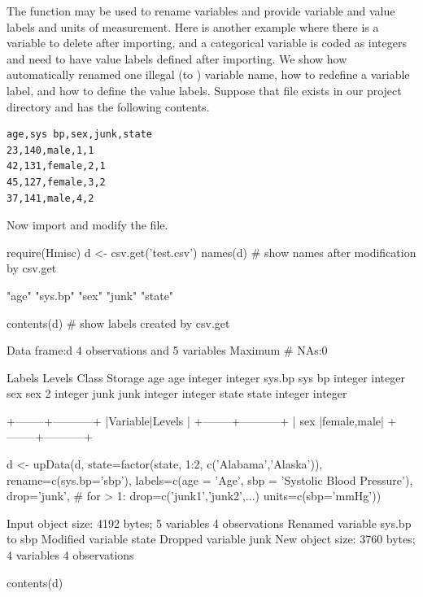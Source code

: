 The   function may be used to rename variables
and provide variable and value labels and units of measurement.
Here is another example where there is a  variable to
delete after importing, and a categorical variable is coded as
integers and need to have value labels defined after
importing.  We show how  automatically renamed one illegal
(to \R) variable name, how to redefine a variable label, and how to
define the value labels.  Suppose that file  exists in
our project directory and has the following contents.
{\small\begin{verbatim}
age,sys bp,sex,junk,state
23,140,male,1,1
42,131,female,2,1
45,127,female,3,2
37,141,male,4,2
\end{verbatim}}
Now import and modify the file.
\begin{Schunk}
\begin{Sinput}
require(Hmisc)
d <- csv.get('test.csv')
names(d)   # show names after modification by csv.get
\end{Sinput}
\begin{Soutput}
[1] "age"    "sys.bp" "sex"    "junk"   "state" 
\end{Soutput}
\begin{Sinput}
contents(d)  # show labels created by csv.get
\end{Sinput}
\begin{Soutput}

Data frame:d	4 observations and 5 variables    Maximum # NAs:0


       Labels Levels   Class Storage
age       age        integer integer
sys.bp sys bp        integer integer
sex       sex      2         integer
junk     junk        integer integer
state   state        integer integer

+--------+-----------+
|Variable|Levels     |
+--------+-----------+
|   sex  |female,male|
+--------+-----------+
\end{Soutput}
\begin{Sinput}
d <- upData(d,
            state=factor(state, 1:2, c('Alabama','Alaska')),
            rename=c(sys.bp='sbp'),
            labels=c(age = 'Age',
                     sbp = 'Systolic Blood Pressure'),
            drop='junk',   # for > 1: drop=c('junk1','junk2',...)
   units=c(sbp='mmHg'))
\end{Sinput}
\begin{Soutput}
Input object size:	 4192 bytes;	 5 variables	 4 observations
Renamed variable	 sys.bp 	to sbp 
Modified variable	state
Dropped variable	junk
New object size:	3760 bytes;	4 variables	4 observations
\end{Soutput}
\begin{Sinput}
contents(d)
\end{Sinput}
\begin{Soutput}


\end{Soutput}
\end{Schunk}
